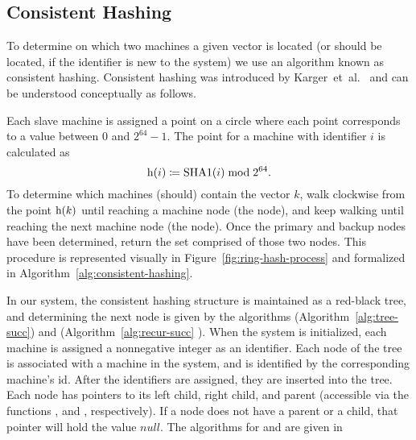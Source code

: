 \subsection{Consistent Hashing}
To determine on which two machines a given vector is located (or should be
located, if the identifier is new to the system) we use an algorithm known as
consistent hashing. Consistent hashing was introduced by
Karger~et~al.~\cite{karger1997} and can be understood conceptually as follows.
\par
Each slave machine is assigned a point on a circle where each point corresponds
to a value between \(0\) and \(2^{64} - 1\). The point for a machine with
identifier \(i\) is calculated as
\begin{equation*}
    \mathrm{h}(i) \coloneqq \mathrm{SHA1}(i) \bmod{2^{64}}.
\end{equation*}
To determine which machines (should) contain the vector \(k\), walk clockwise
from the point \(\mathrm{h}(k)\) until reaching a machine node (the
 node), and keep walking until reaching the next machine node
(the  node). Once the primary and backup nodes have been
determined, return the set comprised of those two nodes. This procedure is
represented visually in Figure~\ref{fig:ring-hash-process} and formalized in
Algorithm~\ref{alg:consistent-hashing}.
%
\par
In our system, the consistent hashing structure is maintained as a red-black
tree, and determining the next node is given by the algorithms
 (Algorithm~\ref{alg:tree-succ}) and
 (Algorithm~\ref{alg:recur-succ} {\cite{bstPredecessorSuccessor}}). When the system is
initialized, each machine is assigned a nonnegative integer as an identifier.
Each node of the tree is associated with a machine in the system, and is
identified by the corresponding machine's id.
After the identifiers are assigned, they are inserted into the tree. Each node
has pointers to its left child, right child, and parent (accessible via the
functions ,  and ,
respectively). If a node does not have a parent or a child, that pointer will
hold the value \(null\). The algorithms for  and
 are given in \cite{cormen2009}
%
